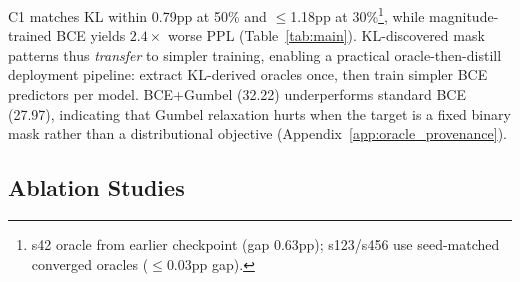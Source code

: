 \begin{table}[t]
\centering
\caption{Target-swap ablation (C1): BCE on KL-derived masks vs.\ KL predictor (same seed), TEAL uniform. All seeds show max $\Delta$$\leq$1.70pp at 30\%; max $\Delta$$\leq$0.79pp at 50\% (s42). $^\dagger$\textbf{Provenance:} s42 oracle extracted from an earlier training run (not seed-matched); s123/s456 use seed-matched retrained oracles (Appendix~\ref{app:oracle_provenance}).}
\label{tab:c1}
\end{table}

C1 matches KL within 0.79pp at 50\% and $\leq$1.18pp at 30\%\footnote{s42 oracle from earlier checkpoint (gap 0.63pp); s123/s456 use seed-matched converged oracles ($\leq$0.03pp gap).}, while magnitude-trained BCE yields $2.4\times$ worse PPL (Table~\ref{tab:main}).
KL-discovered mask patterns thus \emph{transfer} to simpler training, enabling a practical oracle-then-distill deployment pipeline: extract KL-derived oracles once, then train simpler BCE predictors per model.
BCE+Gumbel (32.22) underperforms standard BCE (27.97), indicating that Gumbel relaxation hurts when the target is a fixed binary mask rather than a distributional objective (Appendix~\ref{app:oracle_provenance}).

\subsection{Ablation Studies}

